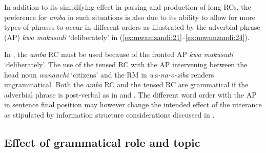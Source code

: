 \documentclass[output=paper,colorlinks,citecolor=brown]{langscibook}
\begin{document}
In addition to its simplifying effect in parsing and production of long RCs, the preference for \textit{amba} in such situations is also due to its ability to allow for more types of phrases to occur in different orders as illustrated by the adverbial phrase (AP) \textit{kwa makusudi} ‘deliberately’ in (\ref{ex:mwamzandi:21}--\ref{ex:mwamzandi:24}).

\z

In , the \textit{amba} RC must be used because of the fronted AP \textit{kwa makusudi} ‘deliberately’. The use of the tensed RC with the AP intervening between the head noun \textit{wananchi} ‘citizens’ and the RM in \textit{wa-na-o-ziba} renders  ungrammatical. Both the \textit{amba} RC and the tensed RC are grammatical if the adverbial phrase is post-verbal as in  and . The different word order with the AP in sentence final position may however change the intended effect of the utterance as stipulated by information structure considerations discussed in .

\subsection{Effect of grammatical role and topic}\label{sec:mwamzandi:4.3}
\end{document}
